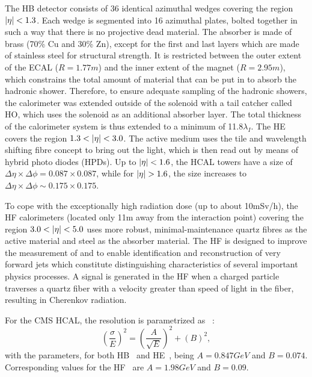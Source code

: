 The HB detector consists of 36 identical azimuthal wedges covering the region $\lvert \eta \rvert<1.3$. Each wedge is segmented into 16
azimuthal plates, bolted together in such a way that there is no projective dead material. The absorber is made of brass (70\% Cu
and 30\% Zn), except for the first and last layers which are made of stainless steel for structural strength. It is restricted 
between the outer extent of the ECAL ($R=1.77\unit{m}$) and the inner extent of the magnet ($R=2.95\unit{m}$), which constrains
the total amount of material that can be put in to absorb the hadronic shower. Therefore, to ensure adequate sampling of the
hadronic showers, the calorimeter was extended outside of the solenoid  with a tail catcher called HO, which uses the solenoid 
as an additional absorber layer. The total thickness of the calorimeter system is thus extended to a minimum of 11.8$\lambda_{I}$. 
The HE covers the region $1.3<\lvert \eta \rvert<3.0$. The active medium uses the tile and wavelength shifting fibre concept to bring out 
the light, which is then read out by means of hybrid photo diodes (\gls{HPDs}). Up to $\lvert \eta \rvert<1.6$, the HCAL towers have a size of 
$\Delta\eta\times\Delta\phi=0.087\times0.087$, while for $\lvert \eta \rvert>1.6$, the size increases to $\Delta\eta\times\Delta\phi\sim0.175\times0.175$.

To cope with the exceptionally high radiation dose (up to about 10\unit{mSv}/h), the HF calorimeters (located only 11\unit{m} away from
the interaction point) covering the region $3.0<\lvert \eta \rvert<5.0$ uses more robust, minimal-maintenance quartz fibres as the active material 
and steel as the absorber material. The HF is designed to improve the measurement of \met and to enable identification and reconstruction of 
very forward jets which constitute distinguishing characteristics of several important physics processes. A signal is generated in the HF when 
a charged particle traverses a quartz fiber with a velocity greater than speed of light in the fiber, resulting in Cherenkov radiation.

For the CMS HCAL, the resolution is parametrized as~\cite{cmsTDR,Leonard:2010zda} :
\begin{equation}
\left(\frac{\sigma}{E}\right)^{2} = \left(\frac{A}{\sqrt{E}}\right)^{2} + \left(B\right)^{2},
\end{equation}
with the parameters, for both HB~\cite{Abdullin:2008zzb} and HE~\cite{Baiatian:2008zz}, being $A=0.847\unit{GeV}$ and $B=0.074$. 
Corresponding values for the HF~\cite{Bayatian:2006jz} are $A=1.98\unit{GeV}$ and $B=0.09$.

